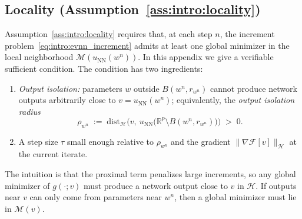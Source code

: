 \documentclass[twoside,11pt]{article}
\newcommand{\R}{\mathbb{R}}
\newcommand{\NN}{\mathrm{NN}}
\newcommand{\calF}{\mathcal{F}}
\newcommand{\calH}{\mathcal{H}}
\newcommand{\calM}{\mathcal{M}}
\newcommand{\dist}{\mathrm{dist}}
\begin{document}
\subsection{Locality (Assumption~\ref{ass:intro:locality})}\label{app:suff-locality}

Assumption~\ref{ass:intro:locality} requires that, at each step $n$, the increment problem~\eqref{eq:intro:evnn_increment} admits at least one global minimizer in the local neighborhood $\calM(u_\NN(w^n))$. In this appendix we give a verifiable sufficient condition. The condition has two ingredients:
\begin{enumerate}
\item[(I)] \emph{Output isolation:} parameters $w$ outside $B(w^n,r_{w^n})$ cannot produce network outputs arbitrarily close to $v=u_\NN(w^n)$; equivalently, the \emph{output isolation radius}
\begin{equation}\label{eq:rho-isolation}
\rho_{w^n}\;:=\;\dist_{\mathcal H}\Big(v,\ u_\NN\big(\R^p\setminus B(w^n,r_{w^n})\big)\Big)\;>\;0.
\end{equation}
\item[(II)] A step size $\tau$ small enough relative to $\rho_{w^n}$ and the gradient $\|\nabla\calF[v]\|_\calH$ at the current iterate.
\end{enumerate}
The intuition is that the proximal term penalizes large increments, so any global minimizer of $g(\cdot;v)$ must produce a network output close to $v$ in $\calH$. If outputs near $v$ can only come from parameters near $w^n$, then a global minimizer must lie in $\calM(v)$.
\end{document}
